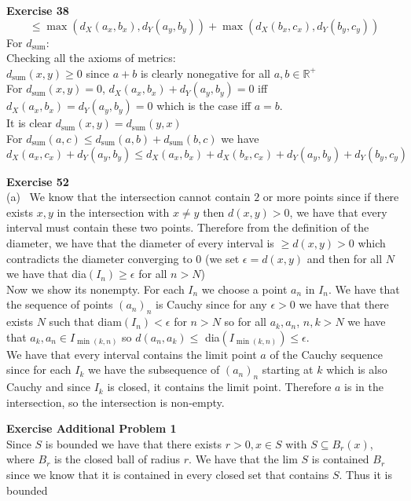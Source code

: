 \documentclass[12pt]{article}
\newenvironment{ques}[1]{\textbf{Exercise #1}\vspace{1 mm}\\ }{\bigskip}
\theoremstyle{definition}
\newcommand{\R}{\mathbb R}
\begin{document}
\begin{ques}{38}
	$$\leq \max(d_X(a_x, b_x) , d_Y(a_y, b_y)) + \max(d_X(b_x,c_x) , d_Y(b_y,c_y))$$
	For $d_\text{sum}$:\\
	Checking all the axioms of metrics:\\
	$d_\text{sum}(x,y) \geq 0$ since $a + b$ is clearly nonegative for all
	$a,b \in \R^+$\\
	For $d_\text{sum}(x,y) = 0$, $d_X(a_x,b_x) + d_Y(a_y,b_y) = 0$ iff
	$d_X(a_x,b_x) = d_Y(a_y,b_y) = 0$ which is the case iff $a = b$.\\
	It is clear $d_\text{sum}(x,y) = d_\text{sum}(y,x)$\\
	For $d_\text{sum}(a, c) \leq d_\text{sum}(a,b) + d_\text{sum}(b,c)$ we have 
	$$d_X(a_x,c_x) + d_Y(a_y,b_y) \leq d_X(a_x,b_x) + d_X(b_x,c_x) +
	d_Y(a_y,b_y) + d_Y(b_y,c_y)$$
\end{ques}

\begin{ques}{52}
	(a) \ We know that the intersection cannot contain $2$ or more points since
	if there exists $x, y$ in the intersection with $x \neq y$ then $d(x,y) >
	0$, we have that every interval must contain these two points.  Therefore
	from the definition of the diameter, we have that the diameter of every
	interval is $\geq d(x,y) > 0$ which contradicts the diameter converging to
	$0$ (we set $\epsilon = d(x,y)$ and then for all $N$ we have that dia$(I_n)
	\geq \epsilon$ for all $n > N$)\\
	Now we show its nonempty. For each $I_n$ we choose a point $a_n$ in $I_n$.
	We have that the sequence of points $(a_n)_n$ is Cauchy since for any
	$\epsilon > 0$ we have that there exists $N$ such that diam$(I_n) <
	\epsilon$ for $n > N$ so for all $a_k, a_n$, $n,k > N$ we have that $a_k,
	a_n \in I_{\min(k,n)}$ so $d(a_n,a_k) \leq $ dia$(I_{\min(k,n)}) \leq \epsilon$.\\
	We have that every interval contains the limit point $a$ of the Cauchy
	sequence since for each $I_k$ we have the subsequence of $(a_n)_n$ starting
	at $k$ which is also Cauchy and since $I_k$ is closed, it contains the
	limit point. Therefore $a$ is in the intersection, so the intersection is
	non-empty.
\end{ques}

\begin{ques}{Additional Problem 1}
	Since $S$ is bounded we have that there exists $r > 0, x \in S$ with $S
	\subseteq B_r(x)$, where $B_r$ is the closed ball of radius $r$. We have
	that the lim $S$ is contained $B_r$ since we know that it is contained in
	every closed set that contains $S$. Thus it is bounded
\end{ques}
\end{document}
